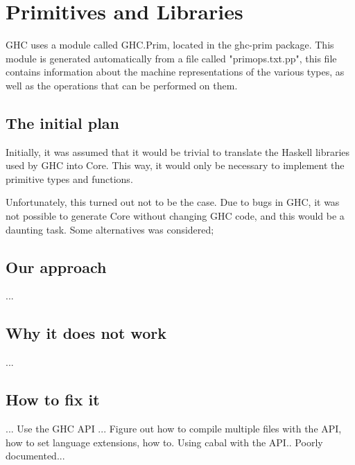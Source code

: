 

\chapter{Primitives and Libraries}

GHC uses a module called GHC.Prim, located in the ghc-prim package. This
module is generated automatically from a file called "primops.txt.pp", this file
contains information about the machine representations of the various types, as
well as the operations that can be performed on them.

\section{The initial plan}

Initially, it was assumed that it would be trivial to translate the Haskell
libraries used by GHC into Core. This way, it would only be necessary to implement
the primitive types and functions.

Unfortunately, this turned out not to be the case. Due to bugs in GHC, it was not 
possible to generate Core without changing GHC code, and this would be a daunting task.
Some alternatives was considered;

\section{Our approach}

...

\section{Why it does not work}

...

\section{How to fix it}

... Use the GHC API ... Figure out how to compile multiple files with
the API, how to set language extensions, how to. Using cabal with the API.. 
Poorly documented...


